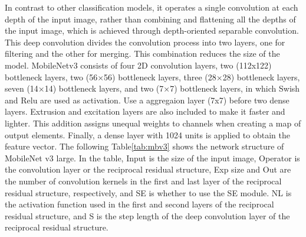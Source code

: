 \documentclass[a4paper,fleqn]{cas-sc}
\begin{document}
In contrast to other classification models, it operates a single convolution at each depth of the input image, rather than combining and flattening all the depths of the input image, which is achieved through depth-oriented separable convolution. This deep convolution divides the convolution process into two layers, one for filtering and the other for merging. This combination reduces the size of the model. MobileNetv3 consists of four 2D convolution layers, two (112x122) bottleneck layers, two (56×56) bottleneck layers, three (28×28) bottleneck layers, seven (14×14) bottleneck layers, and two (7×7) bottleneck layers, in which Swish and Relu are used as activation. Use a aggregaion layer (7x7) before two dense layers. Extrusion and excitation layers are also included to make it faster and lighter. This addition assigns unequal weights to channels when creating a map of output elements. Finally, a dense layer with 1024 units is applied to obtain the feature vector. The following Table\ref{tab:mbv3} shows the network structure of MobileNet v3 large. In the table, Input is the size of the input image, Operator is the convolution layer or the reciprocal residual structure, Exp size and Out are the number of convolution kernels in the first and last layer of the reciprocal residual structure, respectively, and SE is whether to use the SE module. NL is the activation function used in the first and second layers of the reciprocal residual structure, and S is the step length of the deep convolution layer of the reciprocal residual structure.
\end{document}
